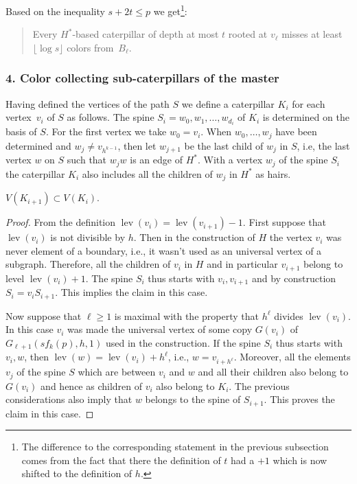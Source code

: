 Based on the inequality $s + 2t \leq p$ we get\footnote{The difference to the
  corresponding statement in the previous subsection comes from the fact that there the
  definition of $t$ had a $+1$ which is now shifted to the definition of
  $h$.}:
\begin{quote}
  Every $H^*$-based caterpillar of depth at most $t$ rooted at $v_\ell$
  misses at least $\lfloor\log s\rfloor$ colors from~$B_\ell$.
\end{quote}

\subsubsection*{4.  Color collecting sub-caterpillars of the master}\hfill

Having defined the vertices of the path $S$ we define a caterpillar $K_i$ for
each vertex~$v_i$ of $S$ as follows. The spine
$S_i =w_0,w_1,\ldots , w_{d_i}$ of $K_i$ is determined on the basis of
$S$. For the first vertex we take $w_0=v_i$. When $w_0 ,\ldots,w_j$ have
been determined and $w_{j}\neq v_{h^{k-1}}$, then let $w_{j+1}$ be the 
last child of $w_j$ in $S$, i.e, the last vertex $w$ on $S$ such
that $w_jw$ is an edge of $H^*$. With a vertex $w_j$ of the spine $S_i$
the caterpillar $K_i$ also includes all the children of $w_j$ in $H^*$
as hairs.

\begin{klaim}
  $V(K_{i+1}) \subset V(K_{i})$.
\end{klaim}

\begin{proof}
  {}From the definition $\operatorname{lev}(v_i) = \operatorname{lev}(v_{i+1})-1$.  First suppose that
  $\operatorname{lev}(v_i)$ is not divisible by $h$.  Then in the construction
  of $H$ the vertex $v_i$ was never element of a boundary, i.e., it wasn't
  used as an universal vertex of a
  subgraph. Therefore, all the children of $v_i$ in $H$ and in particular
  $v_{i+1}$ belong to level $\operatorname{lev}(v_i)+1$.  The spine $S_i$ thus starts with
  $v_i,v_{i+1}$ and by construction $S_i = v_iS_{i+1}$. This implies the claim
  in this case.

  Now suppose that $\ell\geq 1$ is maximal with the property that $h^\ell$
  divides $\operatorname{lev}(v_i)$. In this case $v_i$ was made the universal vertex
  of some copy
  $G(v_i)$ of $G_{\ell+1}(s f_k(p),h,1)$ used in the construction. If the
  spine $S_i$ thus starts with $v_i,w$, then $\operatorname{lev}(w) = \operatorname{lev}(v_i) + h^\ell$,
  i.e., $w = v_{i+h^\ell}$.  Moreover, all the elements $v_j$ of the spine $S$
  which are between $v_i$ and $w$ and all their children also belong to
  $G(v_i)$ and hence as children of $v_i$ also belong to $K_i$.  The previous
  considerations also imply that $w$ belongs to the spine of $S_{i+1}$.  This
  proves the claim in this case.
\end{proof}

